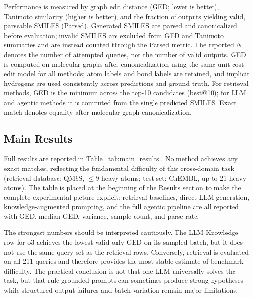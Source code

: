\documentclass[conference]{IEEEtran}
\begin{document}
Performance is measured by graph edit distance (GED; lower is better), Tanimoto similarity (higher is better), and the fraction of outputs yielding valid, parseable SMILES (Parsed). Generated SMILES are parsed and canonicalized before evaluation; invalid SMILES are excluded from GED and Tanimoto summaries and are instead counted through the Parsed metric. The reported $N$ denotes the number of attempted queries, not the number of valid outputs. GED is computed on molecular graphs after canonicalization using the same unit-cost edit model for all methods; atom labels and bond labels are retained, and implicit hydrogens are used consistently across predictions and ground truth. For retrieval methods, GED is the minimum across the top-10 candidates (best@10); for LLM and agentic methods it is computed from the single predicted SMILES. Exact match denotes equality after molecular-graph canonicalization.

\subsection{Main Results}

Full results are reported in Table~\ref{tab:main_results}. No method achieves any exact matches, reflecting the fundamental difficulty of this cross-domain task (retrieval database: QM9S, $\leq9$ heavy atoms; test set: ChEMBL, up to 21 heavy atoms). The table is placed at the beginning of the Results section to make the complete experimental picture explicit: retrieval baselines, direct LLM generation, knowledge-augmented prompting, and the full agentic pipeline are all reported with GED, median GED, variance, sample count, and parse rate.

The strongest numbers should be interpreted cautiously. The LLM Knowledge row for o3 achieves the lowest valid-only GED on its sampled batch, but it does not use the same query set as the retrieval rows. Conversely, retrieval is evaluated on all 211 queries and therefore provides the most stable estimate of benchmark difficulty. The practical conclusion is not that one LLM universally solves the task, but that rule-grounded prompts can sometimes produce strong hypotheses while structured-output failures and batch variation remain major limitations.
\end{document}
